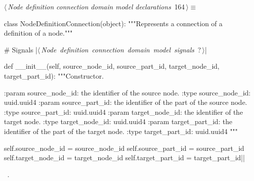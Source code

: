 \documentclass[%
    a4paper,    %
    justified,  %
    nobib,      %
    openany     %
]{tufte-book}
\begin{document}
\begin{flushleft} \small
\begin{minipage}{\linewidth}\label{scrap196}\raggedright\small
{} $\langle\,${\itshape Node definition connection domain model declarations}\nobreak\ {\footnotesize {164}}$\,\rangle\equiv$
\vspace{-1ex}
\begin{pythoncode}
class NodeDefinitionConnection(object):
    """Represents a connection of a definition of a node."""

    # Signals
    |\hbox{$\langle\,${\itshape Node definition connection domain model signals}\nobreak\ {\footnotesize ?}$\,\rangle$}|

    def __init__(self,
                 source_node_id, source_part_id,
                 target_node_id, target_part_id):
        """Constructor.

        :param source_node_id: the identifier of the source node.
        :type  source_node_id: uuid.uuid4
        :param source_part_id: the identifier of the part of the source node.
        :type  source_part_id: uuid.uuid4
        :param target_node_id: the identifier of the target node.
        :type  target_node_id: uuid.uuid4
        :param target_part_id: the identifier of the part of the target node.
        :type  target_part_id: uuid.uuid4
        """

        self.source_node_id = source_node_id
        self.source_part_id = source_part_id
        self.target_node_id = target_node_id
        self.target_part_id = target_part_id|\NWsep|
\end{pythoncode}
\vspace{1.5ex}
\footnotesize
\begin{list}{}{\setlength{\itemsep}{-\parsep}\setlength{\itemindent}{-\leftmargin}}
\item \NWtxtMacroRefIn\ .

\item{}
\end{list}
\end{minipage}\vspace{4ex}
\end{flushleft}
\end{document}
